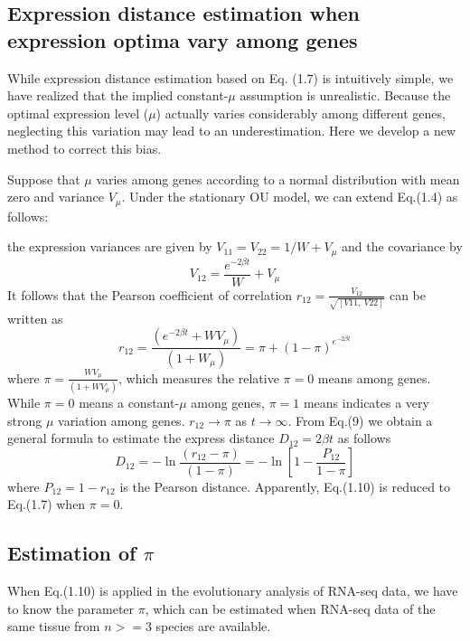 \documentclass[]{book}
\begin{document}
\hypertarget{expression-distance-estimation-when-expression-optima-vary-among-genes}{%
\subsection{Expression distance estimation when expression optima vary among genes}\label{expression-distance-estimation-when-expression-optima-vary-among-genes}}

While expression distance estimation based on Eq. (1.7) is intuitively simple, we have realized that the implied constant-\(\mu\) assumption is unrealistic. Because the optimal expression level (\(\mu\)) actually varies considerably among different genes, neglecting this variation may lead to an underestimation. Here we develop a new method to correct this bias.

Suppose that \(\mu\) varies among genes according to a normal distribution with mean zero and variance \(V_{\mu}\). Under the stationary OU model, we can extend Eq.(1.4) as follows:

the expression variances are given by \(V_{11}=V_{22}=1/W+V_{\mu}\) and the covariance by
\[V_{12}=\frac{e^{-2\beta t}}{W}+V_{\mu}\tag{1.8}\]
It follows that the Pearson coefficient of correlation \(r_{12}=\frac{V_{12}}{\sqrt{\left[V11,\  V22\right]}}\) can be written as
\[r_{12}=\frac{\left(e^{-2\beta t}+WV_{\mu}\right)}{\left(1+W_{\mu}\right)}=\pi+\left(1-\pi\right)^{e^{-2\beta t}}\tag{1.9}\]
where \(\pi=\frac{WV_{\mu}}{\left(1+WV_{\mu}\right)}\), which measures the relative \(\pi=0\) means among genes. While \(\pi=0\) means a constant-\(\mu\) among genes, \(\pi=1\) means indicates a very strong \(\mu\) variation among genes. \(r_{12}\rightarrow\pi\) as \(t\rightarrow \infty\). From Eq.(9) we obtain a general formula to estimate the express distance \(D_{12}=2\beta t\) as follows
\[D_{12}=-\ln\frac{\left(r_{12}-\pi\right)}{\left(1-\pi\right)}=-\ln\left[1-\frac{P_{12}}{1-\pi}\right]\tag{1.10}\]
where \(P_{12}=1-r_{12}\) is the Pearson distance. Apparently, Eq.(1.10) is reduced to Eq.(1.7) when \(\pi=0\).

\hypertarget{estimation-of-pi}{%
\subsection{\texorpdfstring{Estimation of \(\pi\)}{Estimation of \textbackslash{}pi}}\label{estimation-of-pi}}

When Eq.(1.10) is applied in the evolutionary analysis of RNA-seq data, we have to know the parameter \(\pi\), which can be estimated when RNA-seq data of the same tissue from \(n>=3\) species are available.
\end{document}
